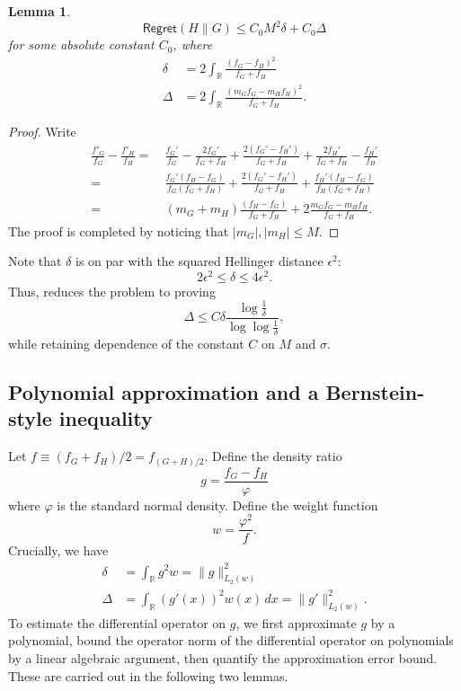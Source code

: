 \documentclass[letterpaper,11pt]{article}
\newcommand{\reals}{\mathbb{R}}
\newtheorem{lemma}[theorem]{Lemma}
\theoremstyle{definition}
\newcommand{\Regret}{\mathsf{Regret}}
\begin{document}
    \begin{lemma}
      \label{lmm:reduction}
      \[
      \Regret(H\|G)
        \leq C_0 M^2 \delta + C_0 \Delta
      \]
      for some absolute constant $C_0$, where
 \begin{align}
      \delta &= 2 \int_\reals \frac{(f_G-f_H)^2}{f_G+f_H} \\
      \Delta &= 2 \int_\reals \frac{(m_Gf_G-m_Hf_H)^2}{f_G+f_H}.
    \end{align}
    \end{lemma}
    \begin{proof}
      Write
      \begin{align}
        \frac{f'_G}{f_G} - \frac{f'_H}{f_H}
        = & ~  \frac{f_G'}{f_G}-\frac{2f_G'}{f_G+f_H} + \frac{2(f_G'-f_H')}{f_G+f_H} +
        \frac{2f_H'}{f_G+f_H}  - \frac{f_H'}{f_H}\nonumber\\
        = & ~   \frac{f_G'(f_H-f_G)}{f_G(f_G+f_H)} + \frac{2(f_G'-f_H')}{f_G+f_H} +
        \frac{f_H'(f_H-f_G)}{f_H(f_G+f_H)} \nonumber \\
        = & ~   (m_G+m_H)
        \frac{(f_H-f_G)}{f_G+f_H} + 2 \frac{m_G f_G-m_H f_H}{f_G+f_H}.
        \label{eq:decomp}
      \end{align}
      The proof is completed by noticing that   $|m_G|,|m_H|\leq M$.
    \end{proof}
Note that $\delta$ is on par with the squared Hellinger distance
$\epsilon^2$:
\begin{equation}
2 \epsilon^2 \leq \delta \leq 4\epsilon^2.
\label{eq:delta-eps}
\end{equation}
Thus,  reduces the problem to proving
    \[
      \Delta \leq C \delta \frac{\log \frac{1}{\delta}}{\log\log \frac{1}{\delta}},
    \]
    while retaining dependence of the constant $C$ on $M$ and $\sigma$. 


    \subsection{Polynomial approximation and a Bernstein-style inequality}


    Let $f \equiv (f_G+f_H)/2= f_{(G+H)/2}$.
Define the density ratio
    \begin{equation}
      g = \frac{f_G-f_H}{\varphi}
      \label{eq:g}
    \end{equation}
    where $\varphi$ is the standard normal density.
    Define the weight function
\begin{equation}
w = \frac{\varphi^2}{f}.
    \label{eq:w}
\end{equation}
    Crucially, we have
    \begin{align}
      \delta &= \int_{\reals} g^2 w = \|g\|_{L_2(w)}^2 \label{eq:delta}\\
      \Delta &= \int_{\reals} (g'(x))^2 w(x)\,dx = \|g'\|_{L_2
      (w)}^2
      \label{eq:Delta}.
    \end{align}
    To estimate the differential operator on $g$, we first approximate $g$ by a polynomial, bound the operator norm of
    the differential operator on polynomials by a linear algebraic argument, then quantify the approximation error bound. These are carried out in the following two lemmas.
\end{document}
